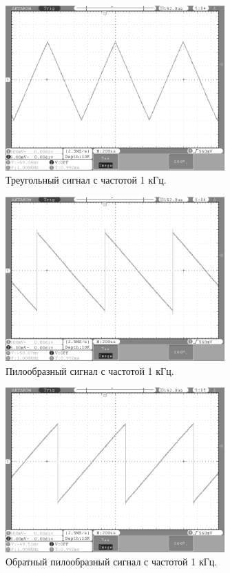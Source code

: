 	\begin{figure}[H]
    \centering
    \includegraphics[width=0.75\textwidth]{../image/triangle1.bmp}
    \caption{Треугольный сигнал с частотой 1 кГц.}
	\end{figure}	

	\begin{figure}[H]
    \centering
    \includegraphics[width=0.75\textwidth]{../image/l_saw1.bmp}
    \caption{Пилообразный сигнал с частотой 1 кГц.}
	\end{figure}	
	
	\begin{figure}[H]
    \centering
    \includegraphics[width=0.75\textwidth]{../image/r_saw1.bmp}
    \caption{Обратный пилообразный сигнал с частотой 1 кГц.}
	\end{figure}	
	
